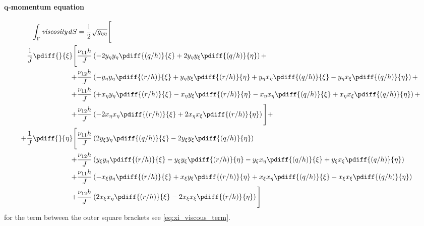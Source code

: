 \paragraph*{$\bm q$-momentum equation}
\vspace{-1\baselineskip}
\begin{align}
\int_\Gamma \textit{viscosity} \, dS & = \half \sqrt{g_{\eta\eta}} \Bigg[
\\
\frac{1}{J} \pdiff{}{\xi}\Bigg[ &
\frac{\nu_{11} h}{J} \left(
- 2 y_{\eta}  y_{\eta} \pdiff{(q/h)}{\xi}
+ 2 y_{\eta} y_{\xi} \pdiff{(q/h)}{\eta} \right)
+
\\ + &
\frac{\nu_{12} h}{J} \left(
- y_{\eta}y_{\eta} \pdiff{(r/h)}{\xi}
+ y_{\eta}y_{\xi} \pdiff{(r/h)}{\eta}
+ y_{\eta}x_{\eta}\pdiff{(q/h)}{\xi}
- y_{\eta}x_{\xi}\pdiff{(q/h)}{\eta} \right) +
\\ + &
\frac{\nu_{11} h}{J} \left(
+ x_{\eta}y_{\eta} \pdiff{(r/h)}{\xi}
- x_{\eta}y_{\xi} \pdiff{(r/h)}{\eta}
- x_{\eta}x_{\eta}\pdiff{(q/h)}{\xi}
+ x_{\eta}x_{\xi}\pdiff{(q/h)}{\eta}
\right) +
\\
+ &
\frac{\nu_{12} h}{J}   \left(
- 2 x_{\eta}x_{\eta} \pdiff{(r/h)}{\xi}
+ 2 x_{\eta}x_{\xi} \pdiff{(r/h)}{\eta}
\right)
\Bigg] +
\\
+ \frac{1}{J} \pdiff{}{\eta}\Bigg[ &
\frac{\nu_{11} h}{J} \left(
2 y_{\xi}  y_{\eta} \pdiff{(q/h)}{\xi}
- 2 y_{\xi} y_{\xi} \pdiff{(q/h)}{\eta}
\right)
\\* + &
\frac{\nu_{12} h}{J} \left(
y_{\xi}y_{\eta} \pdiff{(r/h)}{\xi}
- y_{\xi}y_{\xi} \pdiff{(r/h)}{\eta}
- y_{\xi}x_{\eta}\pdiff{(q/h)}{\xi}
+ y_{\xi}x_{\xi}\pdiff{(q/h)}{\eta}
\right)
\\* + &
\frac{\nu_{11} h}{J} \left(
- x_{\xi}y_{\eta} \pdiff{(r/h)}{\xi}
+ x_{\xi}y_{\xi} \pdiff{(r/h)}{\eta}
+ x_{\xi}x_{\eta}\pdiff{(q/h)}{\xi}
- x_{\xi}x_{\xi}\pdiff{(q/h)}{\eta}
\right)
\\* + &
\frac{\nu_{12} h}{J} \left(
2 x_{\xi}x_{\eta} \pdiff{(r/h)}{\xi}
- 2 x_{\xi}x_{\xi} \pdiff{(r/h)}{\eta}
\right)
\Bigg]
\end{align}
for the term between the outer square brackets see \autoref{eq:xi_viscous_term}.
